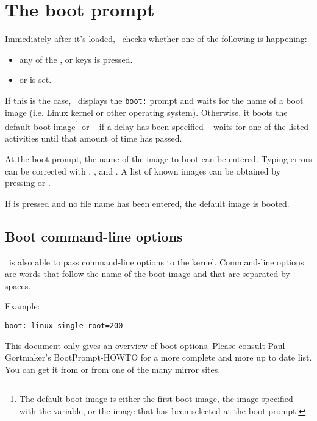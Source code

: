 \newpage
\section{The boot prompt}
\label{cmdopt}

Immediately after it's loaded, \LILO\ checks whether one of the following
is happening:

\begin{itemize}
  \item any of the ,  or  keys is
    pressed.
  \item {} or  is set.
\end{itemize}

If this is the case, \LILO\ displays the \verb"boot:" prompt and waits for
the name of a boot image (i.e. Linux kernel or other operating system).
Otherwise, it boots the default boot image\footnote{%
The default boot image is either the first boot image, the image specified
with the  variable, or the image that
has been selected at the boot prompt.}
or -- if a
delay has been specified -- waits for one of the listed activities
until that amount of time has passed.

At the boot prompt, the name of the image to boot can be entered. Typing
errors can be corrected with , ,
 and . A list of known images can be obtained by
pressing  or .

If  is pressed and no file name has been entered, the default
image is booted.


\subsection{Boot command-line options}

\LILO\ is also able to pass command-line options to the kernel.
Command-line options are words that follow the name of the boot
image and that are separated by spaces.

Example:
\begin{verbatim}
boot: linux single root=200
\end{verbatim}

This document only gives an overview of boot options. Please consult Paul
Gortmaker's BootPrompt-HOWTO for a more complete and more up to date list.
You can get it from
or from one of the many mirror sites.


